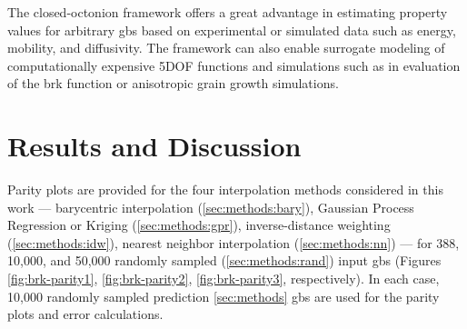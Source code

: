 \documentclass[preprint,12pt]{elsarticle}
\begin{document}
The closed-octonion framework offers a great advantage in estimating property values for arbitrary \glspl{gb} based on experimental or simulated data such as energy, mobility, and diffusivity. The framework can also enable surrogate modeling of computationally expensive 5DOF functions and simulations such as in evaluation of the \gls{brk} function or anisotropic grain growth simulations.

\section{Results and Discussion} \label{sec:resultsDiscussion}

Parity plots are provided for the four interpolation methods considered in this work --- barycentric interpolation (\ref{sec:methods:bary}), Gaussian Process Regression or Kriging (\ref{sec:methods:gpr}), inverse-distance weighting (\ref{sec:methods:idw}), nearest neighbor interpolation (\ref{sec:methods:nn}) --- for 388, 10,000, and 50,000 randomly sampled (\ref{sec:methods:rand}) input \glspl{gb} (Figures \ref{fig:brk-parity1}, \ref{fig:brk-parity2}, \ref{fig:brk-parity3}, respectively). In each case, 10,000 randomly sampled prediction \ref{sec:methods} \glspl{gb} are used for the parity plots and error calculations.
\end{document}
